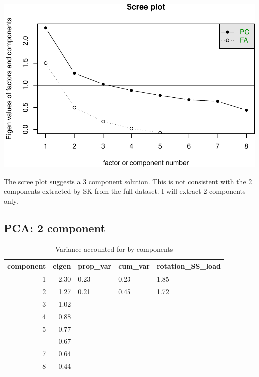 \documentclass[]{article}
\begin{document}
\includegraphics{PCA_covid_files/figure-latex/unnamed-chunk-65-1.pdf}

The scree plot suggests a 3 component solution. This is not consistent
with the 2 components extracted by SK from the full dataset. I will
extract 2 components only.

\hypertarget{pca-2-component-1}{%
\subsection{PCA: 2 component}\label{pca-2-component-1}}

\begin{table}[H]

\caption{\label{tab:unnamed-chunk-66}Variance accounted for by components}
\centering
\fontsize{6}{8}\selectfont
\begin{tabular}[t]{rrlll}
\toprule
component & eigen & prop\_var & cum\_var & rotation\_SS\_load\\
\midrule
1 & 2.30 & 0.23 & 0.23 & 1.85\\
2 & 1.27 & 0.21 & 0.45 & 1.72\\
3 & 1.02 &  &  & \\
4 & 0.88 &  &  & \\
5 & 0.77 &  &  & \\
\addlinespace
6 & 0.67 &  &  & \\
7 & 0.64 &  &  & \\
8 & 0.44 &  &  & \\
\bottomrule
\end{tabular}
\end{table}
\end{document}

